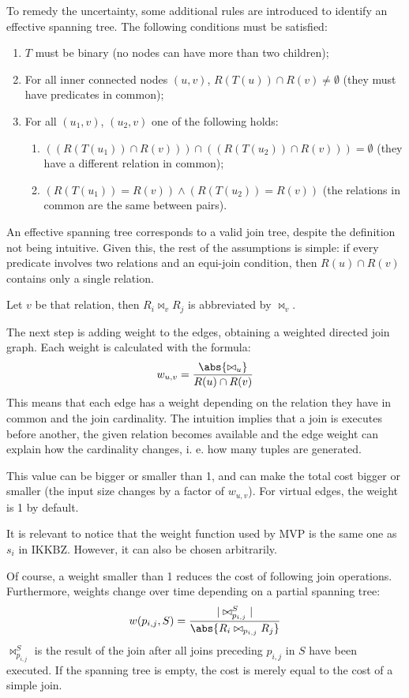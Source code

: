 To remedy the uncertainty, some additional rules are introduced to identify an effective spanning tree. The following conditions must be satisfied:
\begin{enumerate}
	\item $T$ must be binary (no nodes can have more than two children);
	\item For all inner connected nodes $(u, v)$, $R(T(u)) \cap R(v) \neq \emptyset$ (they must have predicates in common);
	\item For all $(u_1, v)$, $(u_2, v)$ one of the following holds:
	\begin{enumerate}
		\item $((R(T(u_1)) \cap R(v))) \cap ((R(T(u_2)) \cap R(v))) = \emptyset$ (they have a different relation in common);
		\item $(R(T(u_1)) = R(v)) \land (R(T(u_2)) = R(v))$ (the relations in common are the same between pairs).
	\end{enumerate}
\end{enumerate}
An effective spanning tree corresponds to a valid join tree, despite the definition not being intuitive. Given this, the rest of the assumptions is simple: if every predicate involves two relations and an equi-join condition, then $R(u) \cap R(v)$ contains only a single relation.

Let $v$ be that relation, then $R_i \bowtie_v R_j$ is abbreviated by $\bowtie_v$.

The next step is adding weight to the edges, obtaining a weighted directed join graph. Each weight is calculated with the formula:
$$w_{u, v} = \frac{\abs{\bowtie_u}}{R(u) \cap R(v)}$$
This means that each edge has a weight depending on the relation they have in common and the join cardinality. The intuition implies that a join is executes before another, the given relation becomes available and the edge weight can explain how the cardinality changes, i. e. how many tuples are generated.

This value can be bigger or smaller than 1, and can make the total cost bigger or smaller (the input size changes by a factor of $w_{u, v}$). For virtual edges, the weight is 1 by default. 

It is relevant to notice that the weight function used by MVP is the same one as $s_i$ in IKKBZ. However, it can also be chosen arbitrarily.

Of course, a weight smaller than 1 reduces the cost of following join operations. Furthermore, weights change over time depending on a partial spanning tree: 
$$w(p_{i, j}, S) = \frac{|\bowtie_{p_{i, j}}^S|}{\abs{R_i \bowtie_{p_{i, j}} R_j}}$$
$\bowtie_{p_{i, j}}^S$ is the result of the join after all joins preceding $p_{i, j}$ in $S$ have been executed. If the spanning tree is empty, the cost is merely equal to the cost of a simple join. 

